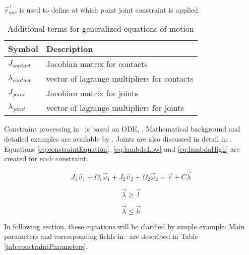 $\vec{r}_{anc}^{\,i}$ is used to define at which point
joint constraint is applied.

\begin {table}[htb!]
\begin{center}
\begin{tabular}{|l| l|}
\hline
{\bf Symbol} & {\bf Description} \\  \hline
$J_{contact}$ & Jacobian matrix for contacts  \\ \hline
$\lambda_{contact}$ & vector of lagrange multipliers for contacts  \\ \hline
$J_{joint}$ & Jacobian matrix for joints  \\ \hline
$\lambda_{joint}$ & vector of lagrange multipliers for joints  \\ \hline
\end {tabular}
\end{center}
\caption {Additional terms  for generalized equations of motion} \label{tab:eom-g}
\end {table}

Constraint processing in \bullet\ is based on ODE, \cite{ode}.
Mathematical background and detailed examples are available by \cite{ode.joints}.
Joints are also discussed in detail in  \citet[p.~60-90]{erleben.thesis}.
Equations \ref{eq:constraintEquation}, \ref{eq:lambdaLow} and
\ref{eq:lambdaHigh} 
are created for each constraint.

\begin{equation} \label{eq:constraintEquation}
J_1 \vec{v}_1 + \Omega_1 \vec{\omega}_1 + 
J_2 \vec{v}_2 + \Omega_2 \vec{\omega}_2 = \vec{c} + C \vec{\lambda}
\end{equation}

\begin{equation} \label{eq:lambdaLow}
\vec{\lambda} \geq \vec{l}
\end{equation}

\begin{equation} \label{eq:lambdaHigh}
\vec{\lambda} \leq \vec{h}
\end{equation}

In following section, these equations will be clarified by simple example.
Main parameters  and corresponding fields in \bullet\  
 are described in Table \ref{tab:constraintParameters}.

